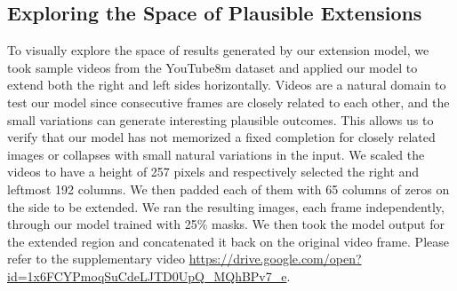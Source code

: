 \subsection{Exploring the Space of Plausible Extensions}
\label{subsec:video}


To visually explore the space of results generated by our extension model, we took sample videos from the YouTube8m dataset \cite{abu2016youtube} and applied our model to extend both the right and left sides horizontally. Videos are a natural domain to test our model since consecutive frames are closely related to each other, and the small variations can generate interesting plausible outcomes. This allows us to verify that our model has not memorized a fixed completion for closely related images or collapses with small natural variations in the input. We scaled the videos to have a height of 257 pixels and respectively selected the right and leftmost 192 columns. We then padded each of them with 65 columns of zeros on the side to be extended. We ran the resulting images, each frame independently, through our model trained with 25\% masks. We then took the model output for the extended region and concatenated it back on the original video frame. Please refer to the supplementary video \url{https://drive.google.com/open?id=1x6FCYPmoqSuCdeLJTD0UpQ_MQhBPv7_e}. 




















